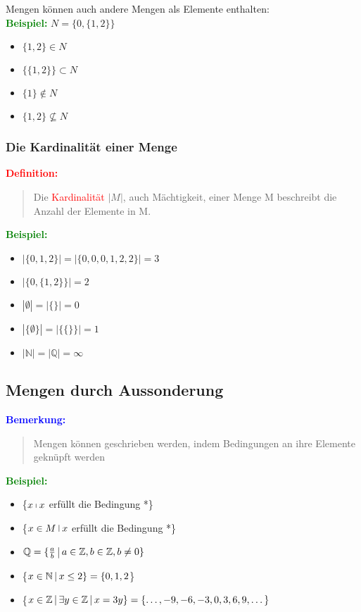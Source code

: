 \documentclass{article}
\newcommand{\smsp}{\phantom{\hspace{3px}}}
\newcommand{\red}[1]{\textcolor{red}{#1}}
\newcommand{\blue}[1]{\textcolor{blue}{#1}}
\newcommand{\green}[1]{\textcolor{green}{#1}}
\newcommand{\ex}{\green{\textbf{Beispiel: }}}
\newcommand{\de}[1]{\red{\textbf{Definition: }}\begin{quote}#1\end{quote}}
\newcommand{\an}[1]{\blue{\textbf{Bemerkung: }}\begin{quote}#1\end{quote}}
\newcommand{\N}{\mathbb{N}}
\newcommand{\Z}{\mathbb{Z}}
\newcommand{\Q}{\mathbb{Q}}
\newcommand{\vst}{\smsp \vline \smsp}
\begin{document}
Mengen können auch andere Mengen als Elemente enthalten:\\
\ex $N = \{0, \{1, 2\}\}$

\begin{itemize}
    \item $\{1, 2\} \in N$
    \item $\{\{1, 2\}\} \subset N$
    \item $\{1\} \notin N$
    \item $\{1, 2\} \nsubseteq N$
\end{itemize}

\subsubsection{Die Kardinalität einer Menge}

\de{Die \red{Kardinalität} $|M|$, auch Mächtigkeit, einer Menge M beschreibt die Anzahl der Elemente in M.}

\ex
\begin{itemize}
    \item $|\{0, 1, 2\}| = |\{0, 0, 0, 1, 2, 2\}| = 3$
    \item $|\{0, \{1, 2\}\}| = 2$
    \item $|\emptyset| = |\{\}| = 0$
    \item $|\{\emptyset\}| = |\{\{\}\}| = 1$
    \item $|\N| = |\Q| = \infty$
\end{itemize}

\subsection{Mengen durch Aussonderung}

\an{Mengen können geschrieben werden, indem Bedingungen an ihre Elemente geknüpft werden}

\ex
\begin{itemize}
    \item \{$x \vst x$ erfüllt die Bedingung *\}
    \item \{$x \in M \vst x$ erfüllt die Bedingung *\}
    \item $\Q = \{\frac{a}{b} \vst a \in \Z, b \in \Z, b \neq 0\}$
    \item \{$x \in \N \vst x \leq 2\} = \{0, 1, 2$\}
    \item \{$x \in \Z \vst \exists y \in \Z \vst x = 3y\} = \{\dots, -9, -6, -3, 0, 3, 6, 9, \dots\}$
\end{itemize}
\end{document}
